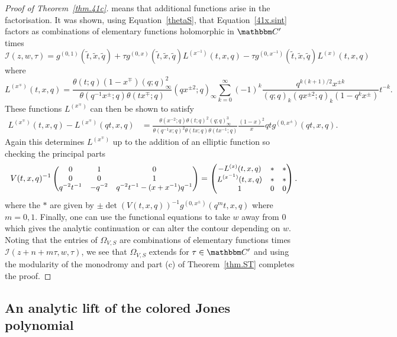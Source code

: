\documentclass[12pt,reqno]{amsart}
\theoremstyle{definition}
\def\BC{\mathbbm C}
\def\calI{\mathcal I}
\def\ti{\widetilde}
\def\tq{\tilde{q}}
\def\be{\begin{equation}}
\def\ee{\end{equation}}
\begin{document}
\begin{proof}[Proof of Theorem~\ref{thm.41c}]
means that additional functions arise in the factorisation. It was shown, using
Equation~\eqref{thetaS}, that Equation~\eqref{41x.sint} factors as combinations
of elementary functions holomorphic in $\BC'$ times
\be
\calI(z,w,\tau)
=
g^{(0,1)}(\tilde{t},\ti x,\tq)+\tau g^{(0,x)}(\tilde{t},\ti x,\tq)
L^{(x^{-1})}(t,x,q)-\tau g^{(0,x^{-1})}(\tilde{t},\ti x,\tq)L^{(x)}(t,x,q)
\ee
where
\be
  L^{(x^{\mp})}(t,x,q)
  =
  \frac{
    \theta(t;q)(1-x^{\mp})(q;q)_{\infty}^2}{\theta(q^{-1}x^{\pm};q)
    \theta(tx^{\mp};q)}(qx^{\pm2};q)_{\infty}\sum_{k=0}^{\infty}(-1)^{k}
  \frac{q^{k(k+1)/2}x^{\pm k}}{(q;q)_{k}(qx^{\pm2};q)_{k}(1-q^{k}x^{\pm})}t^{-k}.
\ee
These functions $L^{(x^\mp)}$ can then be shown to satisfy
\be
\begin{aligned}
  L^{(x^{\mp})}(t,x,q)-L^{(x^{\mp})}(qt,x,q)&=\frac{\theta(x^{-2};q)
    \theta(t;q)^2(q;q)_{\infty}^3}{\theta(q^{-1}x;q)^2\theta(tx;q)
    \theta(tx^{-1};q)}\frac{(1-x)^2}{x}qtg^{(0,x^{\pm})}(qt,x,q).
\end{aligned}
\ee
Again this determines $L^{(x^{\mp})}$ up to the addition of an elliptic function
so checking the principal parts
\be
{\small
V(t,x,q)^{-1}
\begin{pmatrix}
0 & 1 & 0\\
0 & 0 & 1\\
q^{-2}t^{-1} & -q^{-2} & q^{-2}t^{-1}-(x+x^{-1})q^{-1}
\end{pmatrix}
=
\begin{pmatrix}
  -L^{(x)}(t,x,q) & * & *\\
  L^{(x^{-1})}(t,x,q)& * & *\\
  1 & 0 & 0
\end{pmatrix}.
}
\ee
where the $*$ are given by $\pm\det(V(t,x,q))^{-1}g^{(0,x^{\pm})}(q^{m}t,x,q)$
where $m=0,1$. Finally, one can use the functional equations to take $w$ away
from $0$ which gives the analytic continuation or can alter the contour
depending on $w$. Noting that the entries of $\Omega_{V,S}$ are combinations of
elementary functions times $\calI(z+n+m\tau,w,\tau)$, we see that $\Omega_{V,S}$
extends for $\tau\in\BC'$ and using the modularity of the monodromy and part (c)
of Theorem~\ref{thm.ST} completes the proof.
\end{proof}

\subsection{An analytic lift of the colored Jones polynomial}
\label{sub.CJ41lift}
\end{document}
